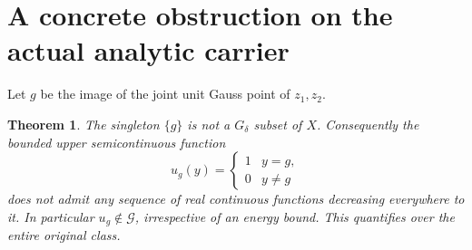 \documentclass[11pt]{article}
\newtheorem{theorem}{Theorem}
\newcommand{\G}{\mathcal G}
\begin{document}
\section*{A concrete obstruction on the actual analytic carrier}
Let $g$ be the image of the joint unit Gauss point of $z_1,z_2$.
\begin{theorem}\label{nongdelta}
The singleton $\{g\}$ is not a $G_\delta$ subset of $X$.
Consequently the bounded upper semicontinuous function
\[
 u_g(y)=\begin{cases}1&y=g,\\0&y\ne g\end{cases}
\]
does not admit any sequence of real continuous functions decreasing
everywhere to it. In particular $u_g\notin\G$, irrespective of an
energy bound. This quantifies over the entire original class.
\end{theorem}
\end{document}
